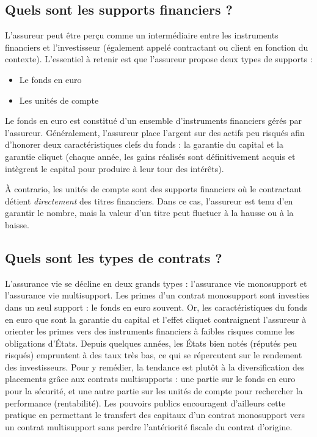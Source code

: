 \documentclass{article}
\begin{document}
\subsection{Quels sont les supports financiers ?}
L'assureur peut être perçu comme un intermédiaire entre les instruments financiers et l'investisseur (également appelé contractant ou client en fonction du contexte). L'essentiel à retenir est que l'assureur propose deux types de supports :
\begin{itemize}
    \item Le fonds en euro
    \item Les unités de compte
\end{itemize}
Le fonds en euro est constitué d'un ensemble d'instruments financiers gérés par l'assureur. Généralement, l'assureur place l'argent sur des actifs peu risqués afin d'honorer deux caractéristiques clefs du fonds : la garantie du capital et la garantie cliquet (chaque année, les gains réalisés sont définitivement acquis et intègrent le capital pour produire à leur tour des intérêts).

À contrario, les unités de compte sont des supports financiers où le contractant détient \textit{directement} des titres financiers. Dans ce cas, l'assureur est tenu d'en garantir le nombre, mais la valeur d'un titre peut fluctuer à la hausse ou à la baisse.

\subsection{Quels sont les types de contrats ?}
L'assurance vie se décline en deux grands types : l'assurance vie monosupport et l'assurance vie multisupport. Les primes d'un contrat monosupport sont investies dans un seul support : le fonds en euro souvent. Or, les caractéristiques du fonds en euro que sont la garantie du capital et l'effet cliquet contraignent l'assureur à orienter les primes vers des instruments financiers à faibles risques comme les obligations d'États. Depuis quelques années, les États bien notés (réputés peu risqués) empruntent à des taux très bas, ce qui se répercutent sur le rendement des investisseurs. Pour y remédier, la tendance est plutôt à la diversification des placements grâce aux contrats multisupports : une partie sur le fonds en euro pour la sécurité, et une autre partie sur les unités de compte pour rechercher la performance (rentabilité). Les pouvoirs publics encouragent d'ailleurs cette pratique en permettant le transfert des capitaux d'un contrat monosupport vers un contrat multisupport sans perdre l'antériorité fiscale du contrat d'origine.
\end{document}
